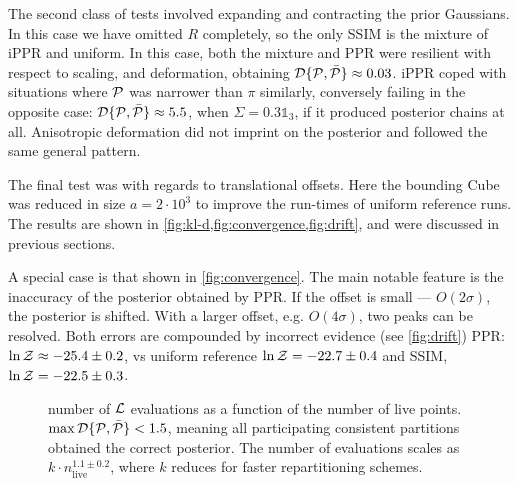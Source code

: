 \documentclass[usenatbib]{mnras}
\begin{document}
The second class of tests involved expanding and contracting the prior
Gaussians. In this case we have omitted \(R\) completely, so the only
SSIM is the mixture of iPPR and uniform. In this case, both the
mixture and PPR were resilient with respect to scaling, and
deformation, obtaining
${\cal D}\{ {\cal P}, \bar{\cal P}\} \approx 0.03$. iPPR coped with
situations where ${\cal P}$ was narrower than $\pi$ similarly,
conversely failing in the opposite case:
${\cal D}\{ {\cal P}, \bar{\cal P}\} \approx 5.5$, when
$\Sigma = 0.3 \mathds{1}_{3}$, if it produced posterior chains at
all. Anisotropic deformation did not imprint on the posterior and
followed the same general pattern.

The final test was with regards to translational offsets. Here the
bounding Cube was reduced in size \(a = 2\cdot 10^{3}\) to improve the
run-times of uniform reference runs. The results are shown in
\cref{fig:kl-d,fig:convergence,fig:drift}, and were discussed in
previous sections.

A special case is that shown in \cref{fig:convergence}. The main
notable feature is the inaccuracy of the posterior obtained by PPR. If
the offset is small --- \(O(2\sigma)\), the posterior is shifted. With
a larger offset, e.g. \(O(4\sigma)\), two peaks can be resolved.  Both
errors are compounded by incorrect evidence (see \cref{fig:drift})
PPR: \(\ln {\cal Z}\approx -25.4 \pm 0.2\), vs uniform reference
\(\ln {\cal Z} = -22.7 \pm 0.4\) and SSIM,
\(\ln {\cal Z} = -22.5 \pm 0.3\).


\begin{figure}
  
  \caption{number of ${\cal L}$ evaluations as a function of the
    number of live points.
    \(\max {\cal D}\{{\cal P}, \bar{\cal P}\} < 1.5\), meaning all
    participating consistent partitions obtained the correct
    posterior. The number of evaluations scales as
    $k\cdot n_\text{live}^{1.1 \pm 0.2}$, where $k$ reduces for faster
    repartitioning schemes. \label{fig:benchmark}}
\end{figure}
\end{document}

